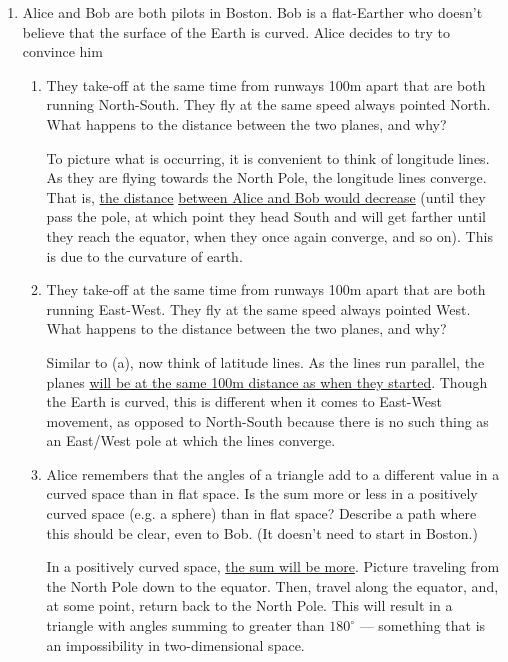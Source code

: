 \begin{enumerate}
\begin{enumerate}
    \end{enumerate}

  \item Alice and Bob are both pilots in Boston. Bob is a flat-Earther who doesn't believe that the surface of the Earth is curved. Alice decides to try to convince him

    \begin{enumerate}

      \item They take-off at the same time from runways 100m apart that are both running North-South. They fly at the same speed always pointed North. What happens to the distance between the two planes, and why?

        To picture what is occurring, it is convenient to think of longitude lines. As they are flying towards the North Pole, the longitude lines converge. That is, \underline{the distance} \underline{between Alice and Bob would decrease} (until they pass the pole, at which point they head South and will get farther until they reach the equator, when they once again converge, and so on). This is due to the curvature of earth.

      \item They take-off at the same time from runways 100m apart that are both running East-West.  They fly at the same speed always pointed West. What happens to the distance between the two planes, and why?

        Similar to (a), now think of latitude lines. As the lines run parallel, the planes \underline{will be at the same 100m distance as when they started}. Though the Earth is curved, this is different when it comes to East-West movement, as opposed to North-South because there is no such thing as an East/West pole at which the lines converge.

      \item Alice remembers that the angles of a triangle add to a different value in a curved space than in flat space. Is the sum more or less in a positively curved space (e.g. a sphere) than in flat space? Describe a path where this should be clear, even to Bob. (It doesn't need to start in Boston.)

        In a positively curved space, \underline{the sum will be more}. Picture traveling from the North Pole down to the equator. Then, travel along the equator, and, at some point, return back to the North Pole. This will result in a triangle with angles summing to greater than $180^{\circ}$ — something that is an impossibility in two-dimensional space.

    \end{enumerate}

\end{enumerate}



